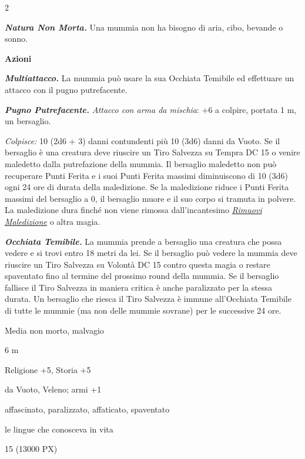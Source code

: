 \begin{multicols}{2}
{\emph{\textbf{Natura Non Morta.}} Una mummia non ha bisogno di aria, cibo, bevande o sonno.

\textbf{Azioni}

\emph{\textbf{Multiattacco.}} La mummia può usare la sua Occhiata Temibile ed effettuare un attacco con il pugno putrefacente.

\emph{\textbf{Pugno Putrefacente.} Attacco con arma da mischia}: +6 a colpire, portata 1 m, un bersaglio.

\emph{Colpisce:} 10 (2d6 + 3) danni contundenti più 10 (3d6) danni da Vuoto. Se il bersaglio è una creatura deve riuscire un Tiro Salvezza su Tempra DC 15 o venire maledetto dalla putrefazione della mummia. Il bersaglio maledetto non può recuperare Punti Ferita e i suoi Punti Ferita massimi diminuiscono di 10 (3d6) ogni 24 ore di durata della maledizione. Se la maledizione riduce i Punti Ferita massimi del bersaglio a 0, il bersaglio muore e il suo corpo si tramuta in polvere. La maledizione dura finché non viene rimossa dall'incantesimo \emph{\hyperlink{Rimuovi Maledizione}{Rimuovi Maledizione}} o altra magia.

\emph{\textbf{Occhiata Temibile.}} La mummia prende a bersaglio una creatura che possa vedere e si trovi entro 18 metri da lei. Se il bersaglio può vedere la mummia deve riuscire un Tiro Salvezza su Volontà DC 15 contro questa magia o restare spaventato fino al termine del prossimo round della mummia. Se il bersaglio fallisce il Tiro Salvezza in maniera critica è anche paralizzato per la stessa durata. Un bersaglio che riesca il Tiro Salvezza è immune all'Occhiata Temibile di tutte le mummie (ma non delle mummie sovrane) per le successive 24 ore.

\begin{description}[noitemsep, topsep=0pt, parsep=0pt, partopsep=0pt, itemsep=1pt, leftmargin=2.35cm,  labelwidth=2.2cm, itemindent=0cm, listparindent=0pt] %
\setlength{\baselineskip}{10pt}
\item[\textbf{Taglia/Tipo}] Media non morto, malvagio
\item[\textbf{Caratt.}] 
\item[\textbf{Punti Ferita}] 
\item[\textbf{Movimento}] 6 m
\item[\textbf{Tiri Salvez.}] 
\item[\textbf{Comp.}] Religione +5, Storia +5
\item[\textbf{Imm. Danni}] da Vuoto, Veleno; armi +1
\item[\textbf{Immunità}] affascinato, paralizzato, affaticato, spaventato
\item[\textbf{Sensi}] 
\item[\textbf{Linguaggi}] le lingue che conosceva in vita
\item[\textbf{Sfida}] 15 (13000 PX)
\end{description}
\smallskip

}
\end{multicols}
